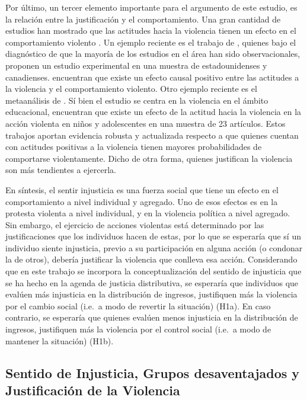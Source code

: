 \documentclass[12pt,twoside]{templates/facsothesis}
\begin{document}
Por último, un tercer elemento importante para el argumento de este estudio, es la relación entre la justificación y el comportamiento. Una gran cantidad de estudios han mostrado que las actitudes hacia la violencia tienen un efecto en el comportamiento violento \citep[e.g.][]{Markowitz2001, Anderson2002, Sedding2018}. Un ejemplo reciente es el trabajo de \citet{Nunes2021}, quienes bajo el diagnóstico de que la mayoría de los estudios en el área han sido observacionales, proponen un estudio experimental en una muestra de estadounidenses y canadienses. \citet{Nunes2021} encuentran que existe un efecto causal positivo entre las actitudes a la violencia y el comportamiento violento. Otro ejemplo reciente es el metaanálisis de \citet{Pina2022}. Sí bien el estudio se centra en la violencia en el ámbito educacional, \citet{Pina2022} encuentran que existe un efecto de la actitud hacia la violencia en la acción violenta en niños y adolescentes en una muestra de 23 artículos. Estos trabajos aportan evidencia robusta y actualizada respecto a que quienes cuentan con actitudes positivas a la violencia tienen mayores probabilidades de comportarse violentamente. Dicho de otra forma, quienes justifican la violencia son más tendientes a ejercerla.

En síntesis, el sentir injusticia es una fuerza social que tiene un efecto en el comportamiento a nivel individual y agregado. Uno de esos efectos es en la protesta violenta a nivel individual, y en la violencia política a nivel agregado. Sin embargo, el ejercicio de acciones violentas está determinado por las justificaciones que los individuos hacen de estas, por lo que se esperaría que sí un individuo siente injusticia, previo a su participación en alguna acción (o condonar la de otros), debería justificar la violencia que conlleva esa acción. Considerando que en este trabajo se incorpora la conceptualización del sentido de injusticia que se ha hecho en la agenda de justicia distributiva, se esperaría que individuos que evalúen más injusticia en la distribución de ingresos, justifiquen más la violencia por el cambio social (i.e.~a modo de revertir la situación) (H1a). En caso contrario, se esperaría que quienes evalúen menos injusticia en la distribución de ingresos, justifiquen más la violencia por el control social (i.e.~a modo de mantener la situación) (H1b).

\hypertarget{sentido-de-injusticia-grupos-desaventajados-y-justificaciuxf3n-de-la-violencia}{%
\subsection{Sentido de Injusticia, Grupos desaventajados y Justificación de la Violencia}\label{sentido-de-injusticia-grupos-desaventajados-y-justificaciuxf3n-de-la-violencia}}
\end{document}
